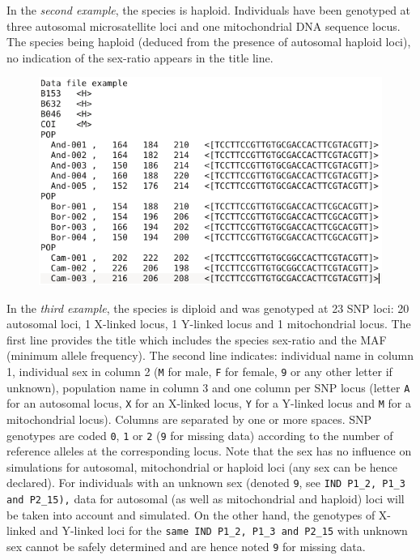 \newpage{}In the \textit{second example}, the species is haploid.
Individuals have been genotyped at three autosomal microsatellite
loci and one mitochondrial DNA sequence locus. The species being haploid
(deduced from the presence of autosomal haploid loci), no indication
of the sex-ratio appears in the title line.

\begin{figure}[h]
\includegraphics[scale=0.6]{gui_pictures/screenga002}
\end{figure}




In the \textit{third example}, the species is diploid and was genotyped
at 23 SNP loci: 20 autosomal loci, 1 X-linked locus, 1 Y-linked locus
and 1 mitochondrial locus. The first line provides the title which
includes the species sex-ratio and the MAF (minimum allele frequency).
The second line indicates: individual name in column 1, individual
sex in column 2 (\texttt{M} for male, \texttt{F} for female, \texttt{9}
or any other letter if unknown), population name in column 3 and one
column per SNP locus (letter \texttt{A} for an autosomal locus, \texttt{X}
for an X-linked locus, \texttt{Y} for a Y-linked locus and \texttt{M}
for a mitochondrial locus). Columns are separated by one or more spaces.
SNP genotypes are coded \texttt{0}, \texttt{1} or \texttt{2} (\texttt{9}
for missing data) according to the number of reference alleles at
the corresponding locus. Note that the sex has no influence on simulations
for autosomal, mitochondrial or haploid loci (any sex can be hence
declared). For individuals with an unknown sex (denoted \texttt{9},
see \texttt{IND P1\_2, P1\_3 and P2\_15),} data for autosomal (as
well as mitochondrial and haploid) loci will be taken into account
and simulated. On the other hand, the genotypes of X-linked and Y-linked
loci for the \texttt{same IND P1\_2, P1\_3 and P2\_15} with unknown
sex cannot be safely determined and are hence noted \texttt{9} for
missing data.

